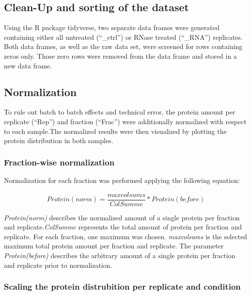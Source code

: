 \documentclass[
]{article}
\begin{document}
\hypertarget{clean-up-and-sorting-of-the-dataset}{%
\subsection{Clean-Up and sorting of the
dataset}\label{clean-up-and-sorting-of-the-dataset}}

Using the R package tidyverse, two separate data frames were generated
containing either all untreated (``\_ctrl'') or RNase treated
(``\_RNA'') replicates. Both data frames, as well as the raw data set,
were screened for rows containing zeros only. Those zero rows were
removed from the data frame and stored in a new data frame.

\hypertarget{normalization}{%
\subsection{Normalization}\label{normalization}}

To rule out batch to batch effects and technical error, the protein
amount per replicate (``Rep'') and fraction (``Frac'') were additionally
normalized with respect to each sample.The normalized results were then
visualized by plotting the protein distribution in both samples.

\hypertarget{fraction-wise-normalization}{%
\subsubsection{Fraction-wise
normalization}\label{fraction-wise-normalization}}

Normalization for each fraction was performed applying the following
equation:

\[Protein(norm) = \frac{maxcolsums}{ColSumme} * Protein(before)\]

\emph{Protein(norm)} describes the normalized amount of a single protein
per fraction and replicate.\emph{ColSumme} represents the total amount
of protein per fraction and replicate. For each fraction, one maximum
was chosen. \emph{maxcolsums} is the selected maximum total protein
amount per fraction and replicate. The parameter \emph{Protein(before)}
describes the arbitrary amount of a single protein per fraction and
replicate prior to normalization.

\hypertarget{scaling-the-protein-distrubition-per-replicate-and-condition}{%
\subsubsection{Scaling the protein distrubition per replicate and
condition}\label{scaling-the-protein-distrubition-per-replicate-and-condition}}
\end{document}

